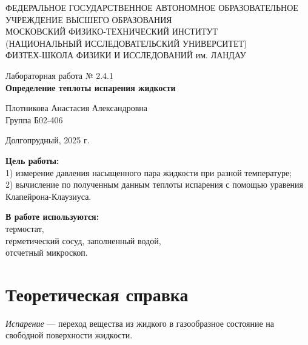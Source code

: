 \documentclass[a4paper,12pt]{article} %
\begin{document}
\begin{center}
	\footnotesize{ФЕДЕРАЛЬНОЕ ГОСУДАРСТВЕННОЕ АВТОНОМНОЕ ОБРАЗОВАТЕЛЬНОЕ 			УЧРЕЖДЕНИЕ ВЫСШЕГО ОБРАЗОВАНИЯ}\\
	\footnotesize{МОСКОВСКИЙ ФИЗИКО-ТЕХНИЧЕСКИЙ ИНСТИТУТ\\(НАЦИОНАЛЬНЫЙ 			ИССЛЕДОВАТЕЛЬСКИЙ УНИВЕРСИТЕТ)}\\
	\footnotesize{ФИЗТЕХ-ШКОЛА ФИЗИКИ И ИССЛЕДОВАНИЙ им. ЛАНДАУ\\}
	\hfill \break
	\hfill \break
	\hfill \break
	\hfill \break
\end{center}

\begin{center}   
    \hfill \break
	\hfill \break
	\hfill \break
	\hfill \break    \hfill \break
	\hfill \break
	\hfill \break
	\hfill \break
    \hfill \break
    \hfill \break
	\hfill \break
	\large{Лабораторная работа № 2.4.1\\\textbf{Определение теплоты испарения жидкости}}\\
	\begin{flushright}
		Плотникова Анастасия Александровна\\
		Группа Б02-406
	\end{flushright}
	\hfill \break
	\hfill \break
	\hfill \break
\end{center}
\hfill \break
\hfill \break
\hfill \break
\hfill \break
\hfill \break
\hfill \break
\hfill \break
\hfill \break
\hfill \break
\hfill \break
\hfill \break
\hfill \break
\hfill \break
\begin{center}
	Долгопрудный, 2025 г.
\end{center}
\thispagestyle{empty}
\newpage
	\textbf{Цель работы:}\\ 1) измерение давления насыщенного пара жидкости при разной температуре;\\ 2) вычисление по полученным данным теплоты испарения с помощью уравения Клапейрона-Клаузиуса.
	\hfill \break
	
	\textbf{В работе используются:}\\ термостат,\\ герметический сосуд, заполненный водой,\\ отсчетный микроскоп.
	
\section{Теоретическая справка}

\textit{Испарение} — переход вещества из жидкого в газообразное состояние на свободной поверхности жидкости. 
\end{document}
